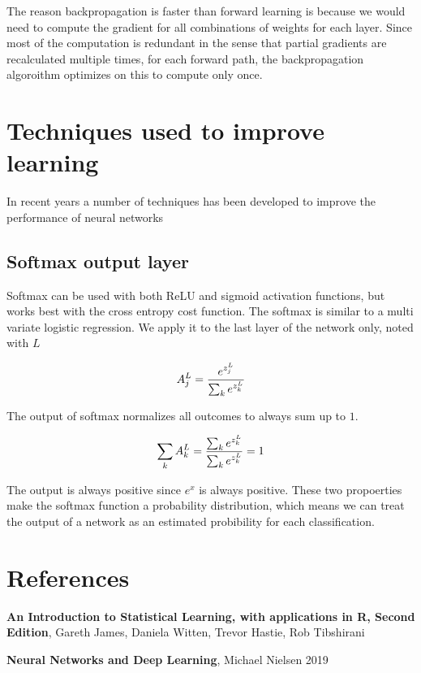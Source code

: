 The reason backpropagation is faster than forward learning is because we would need to compute the gradient for all combinations of weights for each layer. Since most of the computation is redundant in the sense that partial gradients are recalculated multiple times, for each forward path, the backpropagation algoroithm optimizes on this to compute only once.

\section{Techniques used to improve learning}

In recent years a number of techniques has been developed to improve the performance of neural networks

\subsection{Softmax output layer}

Softmax can be used with both ReLU and sigmoid activation functions, but works best with the cross entropy cost function. The softmax is similar to a multi variate logistic regression. We apply it to the last layer of the network only, noted with \(L\)

\[A_j^L = {e^{z_j^L} \over \sum_k e^{z_k^L}}\]

The output of softmax normalizes all outcomes to always sum up to \(1\).

\[\sum_k A_k^L = {\sum_k e^{z_k^L} \over \sum_k e^{z_k^L}} = 1\]

The output is always positive since \(e^x\) is always positive. These two propoerties make the softmax function a probability distribution, which means we can treat the output of a network as an estimated probibility for each classification.

\section{References}

\textbf{An Introduction to Statistical Learning, with applications in R, Second Edition}, Gareth James, Daniela Witten, Trevor Hastie, Rob Tibshirani

\textbf{Neural Networks and Deep Learning}, Michael Nielsen 2019

